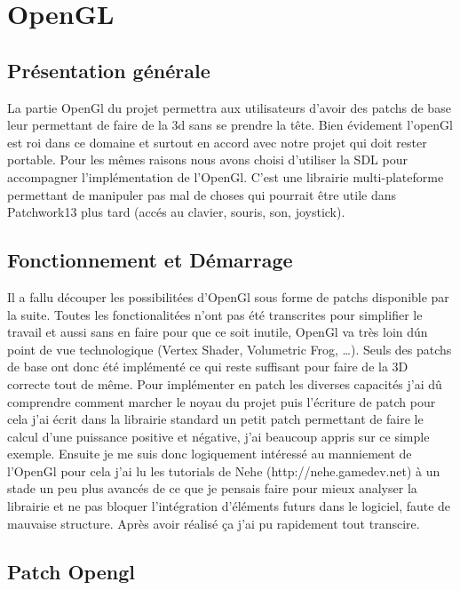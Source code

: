\section{OpenGL}

\subsection{Pr\'esentation g\'en\'erale}

La partie OpenGl du projet permettra aux utilisateurs d'avoir des patchs
 de base leur permettant de faire de la 3d sans se prendre la t\^ete. Bien
 \'evidement l'openGl est roi dans ce domaine et surtout en accord avec notre projet qui doit rester portable.  Pour les m\^emes raisons nous avons
 choisi d'utiliser la SDL pour accompagner l'impl\'ementation de l'OpenGl. 
C'est une librairie multi-plateforme permettant de manipuler pas mal de choses
 qui pourrait \^etre utile dans Patchwork13 plus tard (acc\'es au clavier, 
souris, son, joystick).
	
\subsection{Fonctionnement et D\'emarrage}

Il a fallu d\'ecouper les possibilit\'ees d'OpenGl sous forme de patchs 
disponible par la suite. Toutes les fonctionalit\'ees n'ont pas \'et\'e 
transcrites pour simplifier le travail et aussi sans en faire pour que ce
 soit inutile, OpenGl va tr\`es loin d\'un point de  vue technologique (Vertex Shader, 
Volumetric Frog, \ldots). Seuls des patchs de base ont donc \'et\'e impl\'ement\'e 
ce qui reste suffisant pour faire de la 3D correcte tout de m\^eme. Pour 
impl\'ementer en patch les diverses capacit\'es j'ai dû comprendre comment 
marcher le noyau du projet puis l'\'ecriture de patch pour cela j'ai \'ecrit 
dans la librairie standard un petit patch permettant de faire le calcul d'une 
puissance positive et n\'egative, j'ai beaucoup appris sur ce simple exemple. 
Ensuite je me suis donc logiquement int\'eress\'e au manniement de l'OpenGl pour 
cela j'ai lu les tutorials de Nehe (http://nehe.gamedev.net) à un stade un peu 
plus avanc\'es de ce que je pensais  faire pour mieux analyser la librairie et ne 
pas bloquer l'int\'egration d'\'el\'ements futurs dans le logiciel,  faute de 
mauvaise structure. Apr\`es avoir r\'ealis\'e \c{c}a j'ai pu rapidement tout transcire.

\subsection{Patch Opengl}
